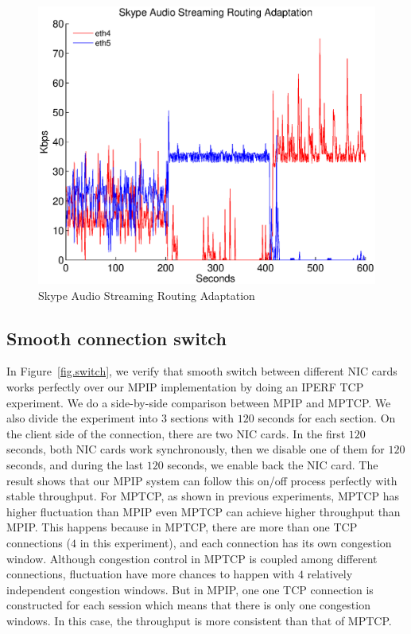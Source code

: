 \begin{figure}
\centering
\includegraphics[width=1\linewidth]{fig/skype.eps}
\caption{Skype Audio Streaming Routing Adaptation}
\label{fig.skype}
\end{figure}


\subsection{Smooth connection switch}
\label{sec:switch}

In Figure~\ref{fig.switch}, we verify that smooth switch between different NIC cards works perfectly over our MPIP implementation by doing an IPERF TCP experiment. We do a side-by-side comparison between MPIP and MPTCP. We also divide the experiment into $3$ sections with $120$ seconds for each section. On the client side of the connection, there are two NIC cards. In the first $120$ seconds, both NIC cards work synchronously, then we disable one of them for $120$ seconds, and during the last $120$ seconds, we enable back the NIC card. The result shows that our MPIP system can follow this on/off process perfectly with stable throughput. For MPTCP, as shown in previous experiments, MPTCP has higher fluctuation than MPIP even MPTCP can achieve higher throughput than MPIP. This happens because in MPTCP, there are more than one TCP connections ($4$ in this experiment), and each connection has its own congestion window. Although congestion control in MPTCP is coupled among different connections, fluctuation have more chances to happen with $4$ relatively independent congestion windows. But in MPIP, one one TCP connection is constructed for each session which means that there is only one congestion windows. In this case, the throughput is more consistent than that of MPTCP.

